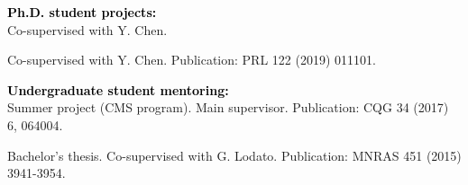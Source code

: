 \documentclass[a4paper]{moderncv}
\begin{document}
\textbf{\textcolor{black}{Ph.D. student projects:}}\vspace{0.05cm}\\
 \vspace{-0.1cm}
\vspace{-0.0cm}
\hspace{0.8cm}Co-supervised with Y. Chen. 
\vspace{0.1cm}

 \vspace{-0.1cm}
\vspace{-0.0cm}
\hspace{0.8cm}Co-supervised with Y. Chen. Publication: PRL 122 (2019) 011101.
\vspace{0.2cm}

\newpage{}

\textbf{\textcolor{black}{Undergraduate student mentoring:}}\vspace{0.1cm}
\\
\vspace{-0.1cm}
\vspace{-0.0cm}
\hspace{0.8cm}Summer project (CMS program). Main supervisor. Publication: CQG 34 (2017) 6, 064004.


\vspace{0.1cm}
\vspace{-0.1cm}
\vspace{-0.0cm}
\hspace{0.8cm}Bachelor's thesis. Co-supervised with G. Lodato. Publication: MNRAS 451 (2015) 3941-3954. 
\end{document}
